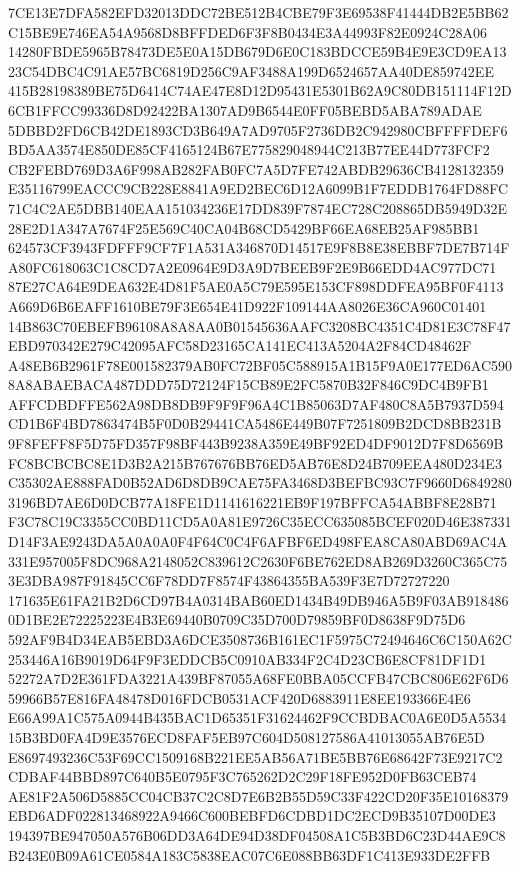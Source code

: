 \documentclass[UTF8,fontset=fandol,zihao=-4,a4paper]{ctexart}
\begin{document}
{{7CE13E7DFA582EFD32013DDC72BE512B4CBE79F3E69538F41444DB2E5BB62C15BE9E746EA54A9568D8BFFDED6F3F8B0434E3A44993F82E0924C28A06
14280FBDE5965B78473DE5E0A15DB679D6E0C183BDCCE59B4E9E3CD9EA1323C54DBC4C91AE57BC6819D256C9AF3488A199D6524657AA40DE859742EE
415B28198389BE75D6414C74AE47E8D12D95431E5301B62A9C80DB151114F12D6CB1FFCC99336D8D92422BA1307AD9B6544E0FF05BEBD5ABA789ADAE
5DBBD2FD6CB42DE1893CD3B649A7AD9705F2736DB2C942980CBFFFFDEF6BD5AA3574E850DE85CF4165124B67E775829048944C213B77EE44D773FCF2
CB2FEBD769D3A6F998AB282FAB0FC7A5D7FE742ABDB29636CB4128132359E35116799EACCC9CB228E8841A9ED2BEC6D12A6099B1F7EDDB1764FD88FC
71C4C2AE5DBB140EAA151034236E17DD839F7874EC728C208865DB5949D32E28E2D1A347A7674F25E569C40CA04B68CD5429BF66EA68EB25AF985BB1
624573CF3943FDFFF9CF7F1A531A346870D14517E9F8B8E38EBBF7DE7B714FA80FC618063C1C8CD7A2E0964E9D3A9D7BEEB9F2E9B66EDD4AC977DC71
87E27CA64E9DEA632E4D81F5AE0A5C79E595E153CF898DDFEA95BF0F4113A669D6B6EAFF1610BE79F3E654E41D922F109144AA8026E36CA960C01401
14B863C70EBEFB96108A8A8AA0B01545636AAFC3208BC4351C4D81E3C78F47EBD970342E279C42095AFC58D23165CA141EC413A5204A2F84CD48462F
A48EB6B2961F78E001582379AB0FC72BF05C588915A1B15F9A0E177ED6AC5908A8ABAEBACA487DDD75D72124F15CB89E2FC5870B32F846C9DC4B9FB1
AFFCDBDFFE562A98DB8DB9F9F9F96A4C1B85063D7AF480C8A5B7937D594CD1B6F4BD7863474B5F0D0B29441CA5486E449B07F7251809B2DCD8BB231B
9F8FEFF8F5D75FD357F98BF443B9238A359E49BF92ED4DF9012D7F8D6569BFC8BCBCBC8E1D3B2A215B767676BB76ED5AB76E8D24B709EEA480D234E3
C35302AE888FAD0B52AD6D8DB9CAE75FA3468D3BEFBC93C7F9660D68492803196BD7AE6D0DCB77A18FE1D1141616221EB9F197BFFCA54ABBF8E28B71
F3C78C19C3355CC0BD11CD5A0A81E9726C35ECC635085BCEF020D46E387331D14F3AE9243DA5A0A0A0F4F64C0C4F6AFBF6ED498FEA8CA80ABD69AC4A
331E957005F8DC968A2148052C839612C2630F6BE762ED8AB269D3260C365C753E3DBA987F91845CC6F78DD7F8574F43864355BA539F3E7D72727220
171635E61FA21B2D6CD97B4A0314BAB60ED1434B49DB946A5B9F03AB9184860D1BE2E72225223E4B3E69440B0709C35D700D79859BF0D8638F9D75D6
592AF9B4D34EAB5EBD3A6DCE3508736B161EC1F5975C72494646C6C150A62C253446A16B9019D64F9F3EDDCB5C0910AB334F2C4D23CB6E8CF81DF1D1
52272A7D2E361FDA3221A439BF87055A68FE0BBA05CCFB47CBC806E62F6D659966B57E816FA48478D016FDCB0531ACF420D6883911E8EE193366E4E6
E66A99A1C575A0944B435BAC1D65351F31624462F9CCBDBAC0A6E0D5A553415B3BD0FA4D9E3576ECD8FAF5EB97C604D508127586A41013055AB76E5D
E8697493236C53F69CC1509168B221EE5AB56A71BE5BB76E68642F73E9217C2CDBAF44BBD897C640B5E0795F3C765262D2C29F18FE952D0FB63CEB74
AE81F2A506D5885CC04CB37C2C8D7E6B2B55D59C33F422CD20F35E10168379EBD6ADF022813468922A9466C600BEBFD6CDBD1DC2ECD9B35107D00DE3
194397BE947050A576B06DD3A64DE94D38DF04508A1C5B3BD6C23D44AE9C8B243E0B09A61CE0584A183C5838EAC07C6E088BB63DF1C413E933DE2FFB
}}
\end{document}
